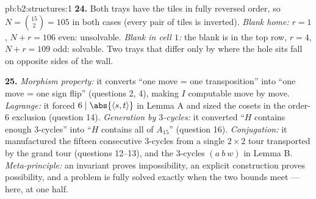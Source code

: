 \begin{solution}{pb:b2:structures:1}
\textbf{24.} Both trays have the tiles in fully reversed order,
so $N = \binom{15}{2} = 105$ in both cases (every pair of tiles
is inverted). \emph{Blank home:} $r = 1$, $N + r = 106$ even:
unsolvable. \emph{Blank in cell $1$:} the blank is in the top
row, $r = 4$, $N + r = 109$ odd: solvable. Two trays that differ
only by where the hole sits fall on opposite sides of the wall.

\textbf{25.} \emph{Morphism property:} it converts ``one move =
one transposition'' into ``one move = one sign flip'' (questions
2, 4), making $I$ computable move by move. \emph{Lagrange:} it
forced $6 \mid \abs{\langle s, t\rangle}$ in Lemma A and sized
the cosets in the order-$6$ exclusion (question 14).
\emph{Generation by $3$-cycles:} it converted ``$H$ contains
enough $3$-cycles'' into ``$H$ contains all of $A_{15}$''
(question 16). \emph{Conjugation:} it manufactured the fifteen
consecutive $3$-cycles from a single $2 \times 2$ tour
transported by the grand tour (questions 12--13), and the
$3$-cycles $(a\ b\ w)$ in Lemma B. \emph{Meta-principle:} an
invariant proves impossibility, an explicit construction proves
possibility, and a problem is fully solved exactly when the two
bounds meet --- here, at one half.
\end{solution}
